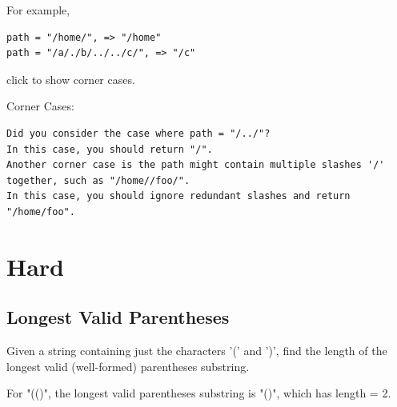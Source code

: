 \documentclass[12pt]{book}
\begin{document}
For example,
\lstset{language=java,label= ,caption= ,numbers=none}
\begin{lstlisting}
path = "/home/", => "/home"
path = "/a/./b/../../c/", => "/c"
\end{lstlisting}

click to show corner cases.

Corner Cases:
\lstset{language=java,label= ,caption= ,numbers=none}
\begin{lstlisting}
Did you consider the case where path = "/../"?
In this case, you should return "/".
Another corner case is the path might contain multiple slashes '/' together, such as "/home//foo/".
In this case, you should ignore redundant slashes and return "/home/foo".
\end{lstlisting}

\section{Hard}
\label{sec-5-3}
\subsection{Longest Valid Parentheses}
\label{sec-5-3-1}
Given a string containing just the characters '(' and ')', find the length of the longest valid (well-formed) parentheses substring.

For "(()", the longest valid parentheses substring is "()", which has length = 2.
\end{document}
